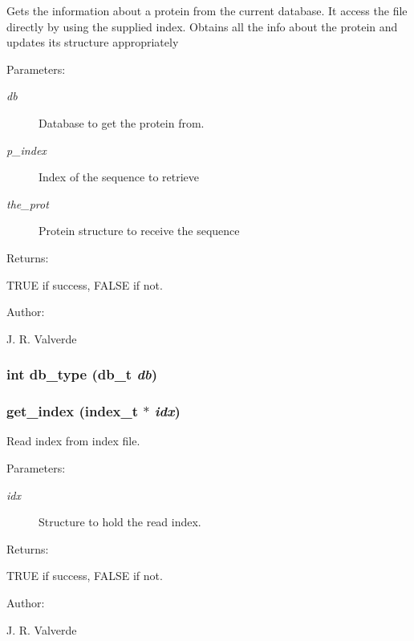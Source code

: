  Gets the information about a protein from the current database. It access the file directly by using the supplied index. Obtains all the info about the protein and updates its structure appropriately\begin{Desc}
\item[Parameters: ]\par
\begin{description}
\item[{\em 
db}]Database to get the protein from. \item[{\em 
p\_\-index}]Index of the sequence to retrieve \item[{\em 
the\_\-prot}]Protein structure to receive the sequence\end{description}
\end{Desc}
\begin{Desc}
\item[Returns: ]\par
TRUE if success, FALSE if not.\end{Desc}
\begin{Desc}
\item[Author: ]\par
J. R. Valverde \end{Desc}
\subsubsection{\setlength{\rightskip}{0pt plus 5cm}int db\_\-type ({\bf db\_\-t} {\em db})}\label{P__db_8h_a6}


\subsubsection{ get\_\-index ({\bf index\_\-t} $\ast$ {\em idx})}\label{P__db_8h_a10}


Read index from index file.



 \begin{Desc}
\item[Parameters: ]\par
\begin{description}
\item[{\em 
idx}]Structure to hold the read index.\end{description}
\end{Desc}
\begin{Desc}
\item[Returns: ]\par
TRUE if success, FALSE if not.\end{Desc}
\begin{Desc}
\item[Author: ]\par
J. R. Valverde \end{Desc}
